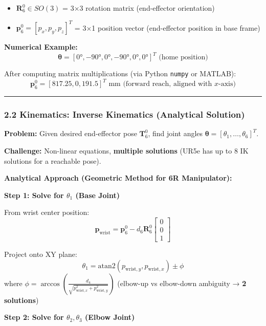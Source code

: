 \documentclass[
]{article}
\providecommand{\tightlist}{%
  \setlength{\itemsep}{0pt}\setlength{\parskip}{0pt}}
\begin{document}
\begin{itemize}
\tightlist
\item
  \(\mathbf{R}_6^0 \in SO(3)\) = 3×3 rotation matrix (end-effector
  orientation)
\item
  \(\mathbf{p}_6^0 = [p_x, p_y, p_z]^T\) = 3×1 position vector
  (end-effector position in base frame)
\end{itemize}

\textbf{Numerical Example:} \[
\boldsymbol{\theta} = [0°, -90°, 0°, -90°, 0°, 0°]^T \text{ (home position)}
\]

After computing matrix multiplications (via Python \texttt{numpy} or
MATLAB): \[
\mathbf{p}_6^0 = [817.25, 0, 191.5]^T \text{ mm (forward reach, aligned with } x \text{-axis)}
\]

\begin{center}\rule{0.5\linewidth}{0.5pt}\end{center}

\hypertarget{kinematics-inverse-kinematics-analytical-solution}{%
\subsubsection{2.2 Kinematics: Inverse Kinematics (Analytical
Solution)}\label{kinematics-inverse-kinematics-analytical-solution}}

\textbf{Problem:} Given desired end-effector pose \(\mathbf{T}_6^0\),
find joint angles
\(\boldsymbol{\theta} = [\theta_1, \ldots, \theta_6]^T\).

\textbf{Challenge:} Non-linear equations, \textbf{multiple solutions}
(UR5e has up to 8 IK solutions for a reachable pose).

\textbf{Analytical Approach (Geometric Method for 6R Manipulator):}

\textbf{Step 1: Solve for \(\theta_1\) (Base Joint)}

From wrist center position: \[
\mathbf{p}_{\text{wrist}} = \mathbf{p}_6^0 - d_6 \mathbf{R}_6^0 \begin{bmatrix} 0 \\ 0 \\ 1 \end{bmatrix}
\]

Project onto XY plane: \[
\theta_1 = \text{atan2}(p_{\text{wrist},y}, p_{\text{wrist},x}) \pm \phi
\] where
\(\phi = \arccos\left(\frac{d_4}{\sqrt{p_{\text{wrist},x}^2 + p_{\text{wrist},y}^2}}\right)\)
(elbow-up vs elbow-down ambiguity → \textbf{2 solutions})

\textbf{Step 2: Solve for \(\theta_2, \theta_3\) (Elbow Joint)}
\end{document}
